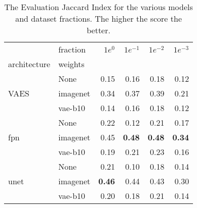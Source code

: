 \begin{table}[ht]
\centering
\caption{The Evaluation Jaccard Index for the various models and dataset fractions. The higher the score the better.}
\label{tab:data_fraction_results}
\begin{tabular}{llrrrr}
\toprule
 & fraction & $1e^0$ & $1e^{-1}$ & $1e^{-2}$ & $1e^{-3}$ \\
architecture & weights &  &  &  &  \\
\midrule
\multirow[c]{3}{*}{VAES} & None & 0.15 & 0.16 & 0.18 & 0.12 \\
 & imagenet & 0.34 & 0.37 & 0.39 & 0.21 \\
 & vae-b10 & 0.14 & 0.16 & 0.18 & 0.12 \\
\multirow[c]{3}{*}{fpn} & None & 0.22 & 0.12 & 0.21 & 0.17 \\
 & imagenet & 0.45 & \textbf{0.48} & \textbf{0.48} & \textbf{0.34} \\
 & vae-b10 & 0.19 & 0.21 & 0.23 & 0.16 \\
\multirow[c]{3}{*}{unet} & None & 0.21 & 0.10 & 0.18 & 0.14 \\
 & imagenet & \textbf{0.46} & 0.44 & 0.43 & 0.30 \\
 & vae-b10 & 0.20 & 0.18 & 0.21 & 0.14 \\
\bottomrule
\end{tabular}
\end{table}
